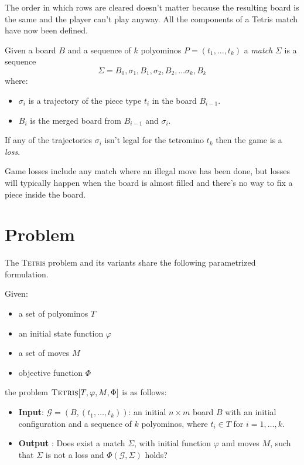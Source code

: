 The order in which rows are cleared doesn't matter because the resulting board is the same and the player can't play anyway. All the components of a Tetris match have now been defined.

\begin{definition}  
  Given a board $B$ and a sequence of $k$ polyominos $P = (t_1,\dots,t_k)$ a \emph{match} $\Sigma$ is a sequence
  $$ \Sigma = B_0, \sigma_1, B_1, \sigma_2, B_2, \dots  \sigma_k, B_k$$ 
  where:
  \begin{itemize}
    \item $\sigma_i$ is a trajectory of the piece type $t_i$ in the board $B_{i-1}$.
    \item $B_{i}$ is the merged board from $B_{i-1}$ and $\sigma_i$.
  \end{itemize}
  If any of the trajectories $\sigma_i$ isn't legal for the tetromino $t_k$ then the game is a \emph{loss}.
\end{definition}

Game losses include any match where an illegal move has been done, but losses will typically happen when the board is almost filled and there's no way to fix a piece inside the board.

\section{Problem}

The \textsc{Tetris} problem and its variants share the following parametrized formulation.
\begin{definition} 
  Given: 
  \begin{itemize}
    \item a set of polyominos $T$
    \item an initial state function $\varphi$
    \item a set of moves $ M $
    \item objective function $\Phi$
  \end{itemize}
    the problem $\textsc{Tetris}[T,\varphi,M,\Phi]$ is as follows:
  
  \begin{itemize}
    \item \textbf{Input}: $\mathcal{G} = (B,(t_1,\dots,t_k))$: an initial $n\times m$ board $B$ with an initial configuration and a sequence of $k$ polyominos, where $t_i \in T$ for $i = 1,\dots,k$.
    
    \item \textbf{Output} : Does exist a match $\Sigma$, with initial function $\varphi$ and moves $M$, such that $\Sigma$ is not a loss and  $\Phi ( \mathcal{G}, \Sigma )$ holds? 
  \end{itemize}


\end{definition}

